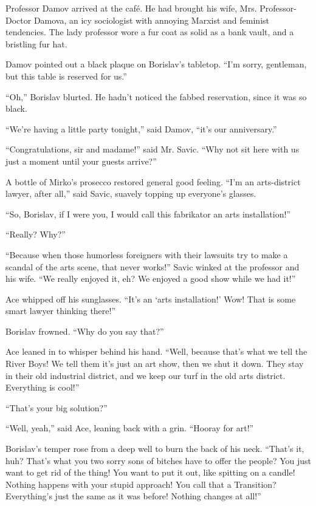 \documentclass[20 pt,twoside,extrafontsizes,final]{memoir}
\begin{document}
Professor Damov arrived at the caf\'e. He had brought his wife, Mrs. Professor-Doctor Damova, an icy sociologist with annoying Marxist and feminist tendencies. The lady professor wore a fur coat as solid as a bank vault, and a bristling fur hat.

Damov pointed out a black plaque on Borislav's tabletop. ``I'm sorry, gentleman, but this table is reserved for us.''

``Oh,'' Borislav blurted. He hadn't noticed the fabbed reservation, since it was so black.

``We're having a little party tonight,'' said Damov, ``it's our anniversary.''

``Congratulations, sir and madame!'' said Mr. Savic. ``Why not sit here with us just a moment until your guests arrive?''

A bottle of Mirko's prosecco restored general good feeling. ``I'm an arts-district lawyer, after all,'' said Savic, suavely topping up everyone's glasses.

``So, Borislav, if I were you, I would call this fabrikator an arts installation!''

``Really? Why?''

``Because when those humorless foreigners with their lawsuits try to make a scandal of the arts scene, that never works!'' Savic winked at the professor and his wife. ``We really enjoyed it, eh? We enjoyed a good show while we had it!''

Ace whipped off his sunglasses. ``It's an `arts installation!' Wow! That is some smart lawyer thinking there!''

Borislav frowned. ``Why do you say that?''

Ace leaned in to whisper behind his hand. ``Well, because that's what we tell the River Boys! We tell them it's just an art show, then we shut it down. They stay in their old industrial district, and we keep our turf in the old arts district. Everything is cool!''

``That's your big solution?''

``Well, yeah,'' said Ace, leaning back with a grin. ``Hooray for art!''

Borislav's temper rose from a deep well to burn the back of his neck. ``That's it, huh? That's what you two sorry sons of bitches have to offer the people? You just want to get rid of the thing! You want to put it out, like spitting on a candle! Nothing happens with your stupid approach! You call that a Transition? Everything's just the same as it was before! Nothing changes at all!''
\end{document}
